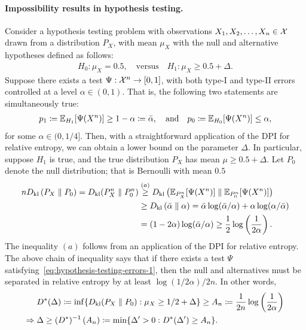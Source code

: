             \paragraph{ Impossibility results in hypothesis testing.} Consider a hypothesis testing problem with  \iid observations $X_1, X_2, \ldots, X_n \in \mathcal{X}$  drawn from a  distribution $P_X$, with mean $\mu_X$ with the null and alternative hypotheses defined as follows: 
            \begin{align}
                H_0: \mu_X = 0.5, \quad \text{versus} \quad 
                H_1: \mu_X \geq 0.5 + \Delta. 
            \end{align}
            Suppose there exists a test $\Psi: \mathcal{X}^n \to [0, 1]$, with both type-I and type-II errors controlled at a level $\alpha \in (0, 1)$. That is, the following two statements are simultaneously true: 
            \begin{align}
                p_1 \coloneqq \mathbb{E}_{H_1}[\Psi(X^n)] \geq 1-\alpha \coloneqq \bar{\alpha}, \quad \text{and} \quad p_0 \coloneqq \mathbb{E}_{H_0}[\Psi(X^n)] \leq \alpha, \label{eq:hypothesis-testing-errors-1}
            \end{align}
            for some $\alpha \in (0, 1/4]$. 
            Then, with a straightforward application of the DPI for relative entropy, we can obtain a lower bound on the parameter $\Delta$. In particular, suppose $H_1$ is true, and the true distribution $P_X$ has mean $\mu \geq 0.5 + \Delta$. Let $P_0$ denote the null distribution; that is Bernoulli with mean $0.5$
            \begin{align}
               n D_{\text{kl}}\left( P_X \parallel P_0 \right) = D_{\text{kl}}(P_X^n \parallel P_0^n) &\stackrel{(a)}{\geq} D_{\text{kl}}\left( \mathbb{E}_{P_X^n}[\Psi(X^n)] \parallel \mathbb{E}_{P_0^n}[\Psi(X^n)] \right) \\
               & \geq D_{\text{kl}}\left( \bar{\alpha} \parallel \alpha \right) = \bar{\alpha} \log (\bar{\alpha}/\alpha) + \alpha \log (\alpha/\bar{\alpha})  \\
               & = (1-2\alpha) \log( \bar{\alpha}/\alpha) \geq \frac{1}{2} \log \left( \frac{1}{2 \alpha} \right). 
            \end{align} 
            The inequality $(a)$ follows from an application of the DPI for relative entropy. 
            The above chain of inequality says that if there exists a test $\Psi$ satisfying~\eqref{eq:hypothesis-testing-errors-1}, then the null and alternatives must be separated in relative entropy by at least $\log(1/2\alpha)/2n$. In other words, 
            \begin{align}
                &D^*(\Delta) \coloneqq \inf \{D_{\text{kl}}(P_X \parallel P_0): \mu_X \geq 1/2 + \Delta\} \geq A_n \coloneqq  \frac{1}{2n} \log \left( \frac{1}{2\alpha} \right) \\
                \Rightarrow \; 
                & \Delta \geq (D^*)^{-1}\left( A_n \right) \coloneqq \min \{\Delta'>0: D^*(\Delta') \geq A_n\}. 
            \end{align}
       
